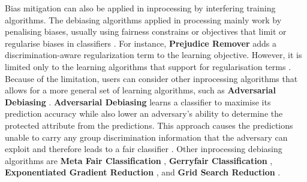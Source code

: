 \documentclass[sigconf,review]{acmart}
\begin{document}
	Bias mitigation can also be applied in inprocessing by interfering training algorithms. The debiasing algorithms applied in processing mainly work by penalising biases, usually using fairness constrains or objectives that limit or regularise biases in classifiers \cite{mahoney2020ai}. For instance, \textbf{Prejudice Remover} \cite{kamishima2012prejudice} adds a discrimination-aware regularization term to the learning objective. However, it is limited only to the learning algorithms that support for regularisation terms \cite{mahoney2020ai,ibmaif3602022guidance}. Because of the limitation, users can consider other inprocessing algorithms that allows for a more general set of learning algorithms, such as \textbf{Adversarial Debiasing} \cite{mahoney2020ai,ibmaif3602022guidance}. \textbf{Adversarial Debiasing} \cite{zhang2018adversarial} learns a classifier to maximise its prediction accuracy while also lower an adversary's ability to determine the protected attribute from the predictions. This approach causes the predictions unable to carry any group discrimination information that the adversary can exploit and therefore leads to a fair classifier \cite{ibmaif3602022guidance}. Other inprocessing debiasing algorithms are \textbf{Meta Fair Classification} \cite{celis2019metafair}, \textbf{Gerryfair Classification} \cite{kearns2018gerry,kearns2019gerry}, \textbf{Exponentiated Gradient Reduction} \cite{agarwal18grid}, and \textbf{Grid Search Reduction} \cite{agarwal18grid,agarwal19grid}.
	
\end{document}
